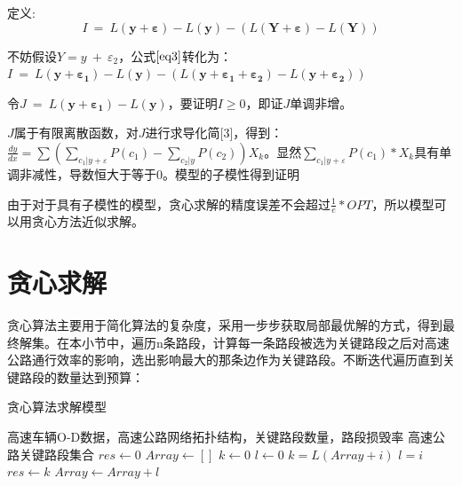 				定义:
				\begin{equation}
				I\ =\ L(\bm{y+\varepsilon})-L(\bm{y})-(L(\bm{Y+ \varepsilon}) - L(\bm{Y}))
				\label{eq3}
				\end{equation}

				不妨假设$Y = y\ +\ \varepsilon_2$，公式$\ref{eq3}$转化为：$I\ =\ L(\bm{y+\varepsilon_1})-L(\bm{y})-(L(\bm{y+ \varepsilon_1+\varepsilon_2}) - L(\bm{y+\varepsilon_2}))$

				令$J\ =\ L(\bm{y+\varepsilon_1})-L(\bm{y})$，要证明$I \ge 0$，即证$J$单调非增。

				$J$属于有限离散函数，对$J$进行求导化简[3]，得到：$\frac{{dy}}{{dx}} = \sum {(\sum\limits_{{c_1}|y + \varepsilon } {P({c_1})}  - \sum\limits_{{c_2}|y} {P({c_2})} )} {X_k}$。显然${\sum\limits_{{c_1}|y + \varepsilon } {P({c_1})} * X_k}$具有单调非减性，导数恒大于等于0。模型的子模性得到证明

				由于对于具有子模性的模型，贪心求解的精度误差不会超过$\frac{1}{e} * OPT$，所以模型可以用贪心方法近似求解。
		\section{贪心求解}
			贪心算法主要用于简化算法的复杂度，采用一步步获取局部最优解的方式，得到最终解集。在本小节中，遍历n条路段，计算每一条路段被选为关键路段之后对高速公路通行效率的影响，选出影响最大的那条边作为关键路段。不断迭代遍历直到关键路段的数量达到预算：
 
		\begin{algorithm}[h]
        \caption{贪心算法求解模型}  
        \label{tanxin}
        \begin{algorithmic}[1] %
            \Require 高速车辆O-D数据，高速公路网络拓扑结构，关键路段数量，路段损毁率
            \Ensure 高速公路关键路段集合
                \State $res\gets 0$  
                \State $Array\gets []$  
                \State $k\gets 0$  
                \State $l\gets 0$  
                        	\State $k=L(Array+i)$  
                        	\State $l=i$  
                    	\EndIf
                	\EndFor    
                    \State $res\gets k$
                    \State $Array\gets Array+l$
                \EndWhile  
                \State {}  
            \EndFunction  
        \end{algorithmic}  
    	\end{algorithm} 

